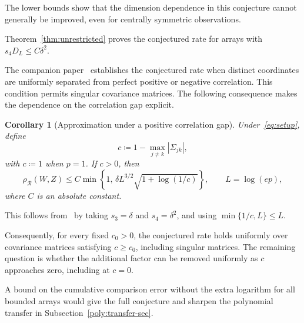 \documentclass[11pt,letterpaper]{article}
\newtheorem{corollary}{Corollary}
\theoremstyle{remark}
\newcommand{\rh}{\rho_{\mathcal R}}
\begin{document}
The lower bounds show that the dimension dependence in this conjecture
cannot generally be improved, even for centrally symmetric observations.


Theorem~\ref{thm:unrestricted} proves the conjectured rate for arrays with ${s_4D_L\le C\delta^2}$.

{
The companion paper~\cite{CorrelationGap} establishes the conjectured rate
when distinct coordinates are uniformly separated from perfect positive
or negative correlation. This condition permits singular covariance
matrices. The following consequence makes the dependence on the
correlation gap explicit.

\begin{samepage}
\begin{corollary}[Approximation under a positive correlation gap]
\label{cor:positive-correlation-gap}
Under~\eqref{eq:setup}, define
\[
 c\coloneqq 1-\max_{j\ne k}|\Sigma_{jk}|,
\]
with \(c\coloneqq 1\) when \(p=1\). If \(c>0\), then
\[
 \rh(W,Z)\le C\min\left\{1,\,
 \delta L^{3/2}\sqrt{1+\log(1/c)}\right\},
 \qquad L=\log(ep),
\]
where \(C\) is an absolute constant.
\end{corollary}
\end{samepage}

This follows from~\cite[Theorem~1]{CorrelationGap} by taking
\(s_3=\delta\) and \(s_4=\delta^2\), and using
\(\min\{1/c,L\}\le L\).

Consequently, for every fixed \(c_0>0\), the conjectured rate holds
uniformly over covariance matrices satisfying \(c\ge c_0\), including
singular matrices. The remaining question is whether the additional
factor can be removed uniformly as \(c\) approaches zero, including at
\(c=0\).
}

A bound on the cumulative comparison error without the extra logarithm for all bounded arrays would give the full conjecture
and sharpen the polynomial transfer in Subsection~\ref{poly:transfer-sec}.
\end{document}
